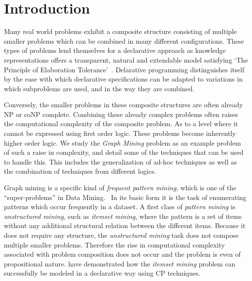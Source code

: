 \section{Introduction}
Many real world problems exhibit a composite structure consisting of multiple smaller problems which can be combined in many different configurations.
These types of problems lend themselves for a declarative approach as knowledge representations offers a transparent, natural and extendable model satisfying `The Principle of Elaboration Tolerance'~\citep{elaboration_tolerance}.
Delarative programming distinguishes itself by the ease with which declarative specifications can be adapted to variations in which subproblems are used, and in the way they are combined.

Conversely, the smaller problems in these composite structures are often already NP or coNP complete.
Combining these already complex problems often raises the computational complexity of the composite problem. As  to a level where it cannot be expressed using first order logic. These problems become inherently higher order logic.
We study the \emph{Graph Mining} problem as an example problem of such a raise in complexity, and detail some of the techniques that can be used to handle this.
This includes the generalization of ad-hoc techniques as well as the combination of techniques from different logics.

Graph mining is a specific kind of \emph{frequent pattern mining}, which is one of the ``super-problems'' in Data Mining.~\cite{}
In its basic form it is the task of enumerating patterns which occur frequently in a dataset.
A first class of \emph{pattern mining} is \emph{unstructured mining}, such as \emph{itemset mining}, where the pattern is a set of items without any additional structural relation between the different items. 
Because it does not require any structure, the \emph{unstructured mining} task does not compose multiple smaller problems.
Therefore the rise in computational complexity associated with problem composition does not occur and the problem is even of propositional nature.
\citet{tias_original} have demonstrated how the \emph{itemset mining} problem can successfully be modeled in a declarative way using CP techniques.

